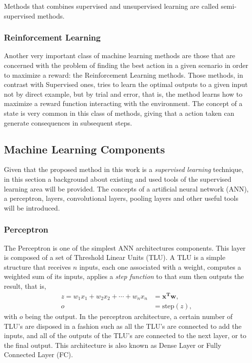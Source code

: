 Methods that combines supervised and unsupervised learning are called semi-supervised methods.

\subsubsection{Reinforcement Learning}
Another very important class of machine learning methods are those that are concerned with the problem of finding the best action in a given scenario in order to maximize a reward: the Reinforcement Learning methods. Those methods, in contrast with Supervised ones, tries to learn the optimal outputs to a given input not by direct example, but by trial and error, that is, the method learns how to maximize a reward function interacting with the environment. The concept of a state is very common in this class of methods, giving that a action taken can generate consequences in subsequent steps. \cite{bishop2006}

\subsection{Machine Learning Components}
Given that the proposed method in this work is a \textit{supervised learning} technique, in this section a background about existing and used tools of the supervised learning area will be provided. The concepts of a artificial neural network (ANN), a perceptron, layers, convolutional layers, pooling layers and other useful tools will be introduced. 

\subsubsection{Perceptron}
The Perceptron\cite{perceptron} is one of the simplest ANN architectures components. This layer is composed of a set of Threshold Linear Units (TLU). A TLU is a simple structure that receives $n$ inputs, each one associated with a weight, computes a weighted sum of its inputs, applies a \textit{step function} to that sum then outputs the result, that is,
\begin{equation}
    \begin{aligned}
        z = w_1 x_1 + w_2 x_2 + \dotsi + w_n x_n &= \boldsymbol{x^T w},\\ 
        o &= \text{step}(z),
    \end{aligned}{}
\end{equation}
with $o$ being the output. In the perceptron architecture, a certain number of TLU's are disposed in a fashion such as all the TLU's are connected to add the inputs, and all of the outputs of the TLU's are connected to the next layer, or to the final output. This architecture is also known as Dense Layer or Fully Connected Layer (FC).




